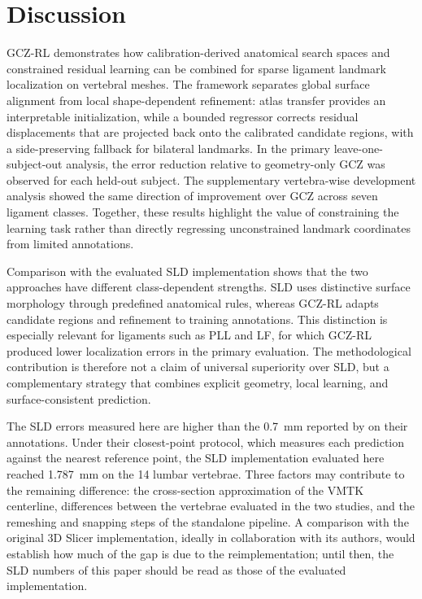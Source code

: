 \documentclass[5p,times,twocolumn,authoryear]{elsarticle}
\newif\ifhighlight
\newcommand{\rev}[1]{\ifhighlight{\color{revcolor}#1}\else#1\fi}
\begin{document}
\section{Discussion}
\label{sec:discussion}

GCZ-RL demonstrates how calibration-derived anatomical search spaces and constrained residual learning can be combined for sparse ligament landmark localization on vertebral meshes. The framework separates global surface alignment from local shape-dependent refinement: atlas transfer provides an interpretable initialization, while a bounded regressor corrects residual displacements \rev{that are projected back onto the calibrated candidate regions, with a side-preserving fallback for bilateral landmarks}. In the primary leave-one-subject-out analysis, the error reduction relative to geometry-only GCZ was observed for each held-out subject. The supplementary vertebra-wise development analysis showed the same direction of improvement over GCZ across seven ligament classes. Together, these results highlight the value of constraining the learning task rather than directly regressing unconstrained landmark coordinates from limited annotations.

Comparison with the evaluated SLD implementation shows that the two approaches have different class-dependent strengths. SLD uses distinctive surface morphology through predefined anatomical rules, whereas GCZ-RL adapts candidate regions and refinement to training annotations. This distinction is especially relevant for ligaments such as PLL and LF, for which GCZ-RL produced lower localization errors in the primary evaluation. The methodological contribution is therefore not a claim of universal superiority over SLD, but a complementary strategy that combines explicit geometry, local learning, and surface-consistent prediction.

The SLD errors measured here are higher than the 0.7~mm reported by \citet{blomenkamp2026sld} on their annotations. Under their closest-point protocol, which measures each prediction against the nearest reference point, the SLD implementation evaluated here reached 1.787~mm on the 14 lumbar vertebrae. Three factors may contribute to the remaining difference: the cross-section approximation of the VMTK centerline, differences between the vertebrae evaluated in the two studies, and the remeshing and snapping steps of the standalone pipeline. A comparison with the original 3D Slicer implementation, ideally in collaboration with its authors, would establish how much of the gap is due to the reimplementation; until then, the SLD numbers of this paper should be read as those of the evaluated implementation.
\end{document}
